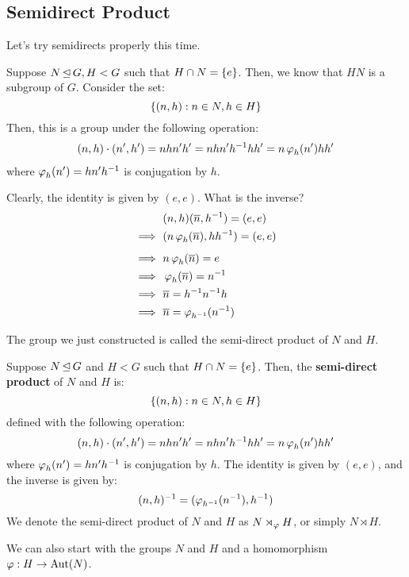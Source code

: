 \subsection{Semidirect Product}
Let's try semidirects properly this time.

Suppose $ N \operatorname{\trianglelefteq} G, H < G $ such that $ H \cap N = \left\{{e}\right\} $.
Then, we know that $ HN $ is a subgroup of $ G $.
Consider the set:
\begin{equation*}
    \left\{{(n, h) : n \in N, h \in H}\right\}
\end{equation*}
Then, this is a group under the following operation:
\begin{gather*}
    (n, h) \cdot (n', h') = nhn'h' = nhn'h^{-1}hh' = n\operatorname{\varphi}_{h}(n')hh'
\end{gather*}
where $ \operatorname{\varphi}_{h}(n') = hn'h^{-1} $ is conjugation by $ h $.

Clearly, the identity is given by $ (e, e) $.
What is the inverse?
%
\begin{align*}
    & (n, h)(\oline{n}, h^{-1}) = (e, e) \\
    \implies \ & (n\vphi_{h}(\oline{n}), hh^{-1}) = (e, e) \vsp
    \implies \ & n\vphi_{h}(\oline{n}) = e^{\phantom{eee}} \\
    \implies \ & \vphi_{h}(\oline{n}) = n^{-1} \\
    \implies \ & \oline{n} = h^{-1}n^{-1}h \\
    \implies \ & \oline{n} = \vphi_{h^{-1}}(n^{-1})
\end{align*}

The group we just constructed is called the semi-direct product of $ N $ and $ H $.

\newpage
\begin{defn}
    Suppose $ N \operatorname{\trianglelefteq} G $ and $ H < G $ such that $ H \cap N = \left\{{e}\right\} $.
    Then, the \textbf{semi-direct product} of $ N $ and $ H $ is:
    \begin{equation*}
        \left\{{(n, h) : n \in N, h \in H}\right\}
    \end{equation*}
    defined with the following operation:
    \begin{equation*}
        (n, h) \cdot (n', h') = nhn'h' = nhn'h^{-1}hh' = n\operatorname{\varphi}_{h}(n')hh'
    \end{equation*}
    where $ \operatorname{\varphi}_{h}(n') = hn'h^{-1} $ is conjugation by $ h $. \vsp
    The identity is given by $ (e, e) $, and the inverse is given by:
    \begin{equation*}
        (n, h)^{-1} = (\operatorname{\varphi}_{h^{-1}}(n^{-1}), h^{-1})
    \end{equation*}
    We denote the semi-direct product of $ N $ and $ H $ as $ N \rtimes_{\operatorname{\varphi}} H $,
    or simply $ N \rtimes H $.
\end{defn}
We can also start with the groups $ N $ and $ H $ and
a homomorphism $ \operatorname{\varphi}: H \rightarrow \operatorname{Aut}(N) $.

